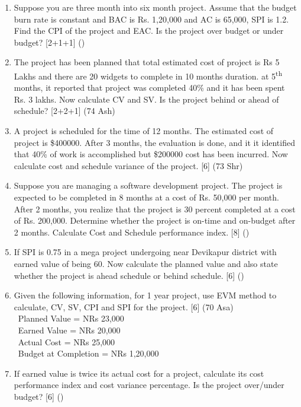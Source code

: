 \documentclass[12pt]{article}
\newcommand{\enter}{\\\textcolor{white}{1}}
\newcommand{\super}[1]{\textsuperscript{#1}}
\begin{document}
\begin{enumerate}
      \item Suppose you are three month into six month project. Assume that the budget burn rate is constant and BAC is Rs. 1,20,000 and AC is 65,000, SPI is 1.2. Find the CPI of the project and EAC. Is the project over budget or under budget? \hfill [2+1+1] ()

      \item The project has been planned that total estimated cost of project is Rs 5 Lakhs and there are 20 widgets to complete in 10 months duration. at 5\super{th} months, it reported that project was completed 40\% and it has been spent Rs. 3 lakhs. Now calculate CV and SV. Is the project behind or ahead of schedule? \hfill [2+2+1] (74 Ash)

      \item A project is scheduled for the time of 12 months. The estimated cost of project is \$400000. After 3 months, the evaluation is done, and it it identified that 40\% of work is accomplished but \$200000 cost has been incurred. Now calculate cost and schedule variance of the project. \hfill [6] (73 Shr)

      \item Suppose you are managing a software development project. The project is expected to be completed in 8 months at a cost of Rs. 50,000 per month. After 2 months, you realize that the project is 30 percent completed at a cost of Rs. 200,000. Determine whether the project is on-time and on-budget after 2 months. Calculate Cost and Schedule performance index. \hfill [8] ()

      \item If SPI is 0.75 in a mega project undergoing near Devikapur district with earned value of being 60. Now calculate the planned value and also state whether the project is ahead schedule or behind schedule. \hfill [6] ()

      \item Given the following information, for 1 year project, use EVM method to calculate, CV, SV, CPI and SPI for the project. \hfill [6] (70 Asa)
        \enter Planned Value = NRs 23,000
        \enter Earned Value = NRs 20,000
        \enter Actual Cost = NRs 25,000
        \enter Budget at Completion = NRs 1,20,000

      \item If earned value is twice its actual cost for a project, calculate its cost performance index and cost variance percentage. Is the project over/under budget? \hfill [6] ()
    \end{enumerate}
\end{document}
